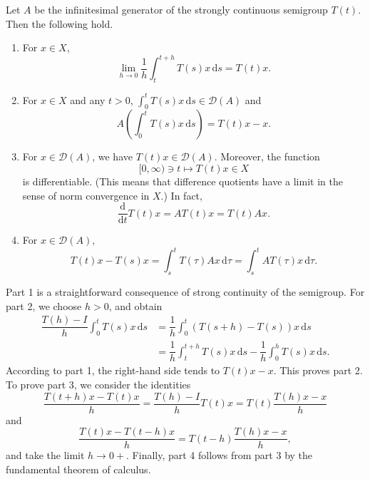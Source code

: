 \begin{Lemma}
\label{lem:semigroup-generator-four-identities}
Let $A$ be the infinitesimal generator of the strongly continuous semigroup $T(t)$. Then the following hold.\begin{enumerate}\item For $x\in X$,
\begin{equation}\label{eq:semigroup-local-average-continuity-limit}
\lim_{h\to0}\dfrac{1}{h}\int_t^{t+h}T(s)x\,\mathrm{d}s=T(t)x.
\end{equation}
\item For $x\in X$ and any $t>0$, $\int_0^t T(s)x\,\mathrm{d}s\in\mathcal{D}(A)$ and
\begin{equation}\label{eq:semigroup-integrated-orbit-in-generator-domain}
A\left(\int_0^t T(s)x\,\mathrm{d}s\right)=T(t)x-x.
\end{equation}
\item For $x\in\mathcal{D}(A)$, we have $T(t)x\in\mathcal{D}(A)$. Moreover, the function\[[0,\infty)\ni t\mapsto T(t)x\in X\]is differentiable. (This means that difference quotients have a limit in the sense of norm convergence in $X$.) In fact,
\begin{equation}\label{eq:semigroup-orbit-generator-differentiation}
\dfrac{\mathrm{d}}{\mathrm{d}t}T(t)x=AT(t)x=T(t)Ax.
\end{equation}
\item For $x\in\mathcal{D}(A)$,
\begin{equation}\label{eq:semigroup-generator-orbit-integral-identity}
T(t)x-T(s)x=\int_s^t T(\tau)Ax\,\mathrm{d}\tau=\int_s^t AT(\tau)x\,\mathrm{d}\tau.
\end{equation}
\end{enumerate}
\end{Lemma}

\begin{Proof}
Part 1 is a straightforward consequence of strong continuity of the semigroup. For part 2, we choose $h>0$, and obtain\[\begin{aligned}
\dfrac{T(h)-I}{h}\int_0^t T(s)x\,\mathrm{d}s&=\dfrac{1}{h}\int_0^t(T(s+h)-T(s))x\,\mathrm{d}s\\
&=\dfrac{1}{h}\int_t^{t+h}T(s)x\,\mathrm{d}s-\dfrac{1}{h}\int_0^h T(s)x\,\mathrm{d}s.
\end{aligned}\]According to part 1, the right-hand side tends to $T(t)x-x$. This proves part 2. To prove part 3, we consider the identities
\begin{equation}\label{eq:semigroup-orbit-forward-difference-commutation}
\dfrac{T(t+h)x-T(t)x}{h}=\dfrac{T(h)-I}{h}T(t)x=T(t)\dfrac{T(h)x-x}{h}
\end{equation}
and
\begin{equation}\label{eq:semigroup-orbit-backward-difference-identity}
\dfrac{T(t)x-T(t-h)x}{h}=T(t-h)\dfrac{T(h)x-x}{h},
\end{equation}
and take the limit $h\to0+$. Finally, part 4 follows from part 3 by the fundamental theorem of calculus.
\end{Proof}


